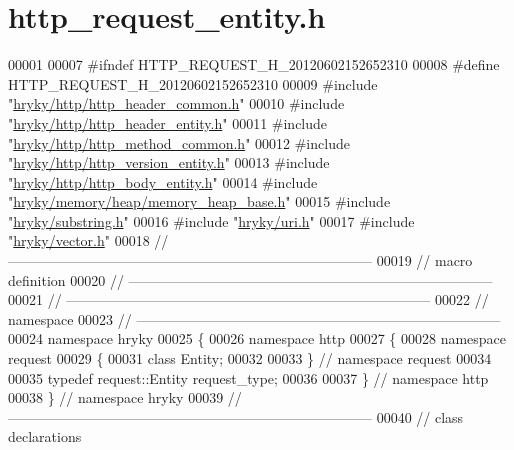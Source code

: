 \hypertarget{http__request__entity_8h_source}{\section{http\-\_\-request\-\_\-entity.\-h}
}

\begin{DoxyCode}
00001 
00007 \textcolor{preprocessor}{#ifndef HTTP\_REQUEST\_H\_20120602152652310}
00008 \textcolor{preprocessor}{}\textcolor{preprocessor}{#define HTTP\_REQUEST\_H\_20120602152652310}
00009 \textcolor{preprocessor}{}\textcolor{preprocessor}{#include "\hyperlink{http__header__common_8h}{hryky/http/http_header_common.h}"}
00010 \textcolor{preprocessor}{#include "\hyperlink{http__header__entity_8h}{hryky/http/http_header_entity.h}"}
00011 \textcolor{preprocessor}{#include "\hyperlink{http__method__common_8h}{hryky/http/http_method_common.h}"}
00012 \textcolor{preprocessor}{#include "\hyperlink{http__version__entity_8h}{hryky/http/http_version_entity.h}"}
00013 \textcolor{preprocessor}{#include "\hyperlink{http__body__entity_8h}{hryky/http/http_body_entity.h}"}
00014 \textcolor{preprocessor}{#include "\hyperlink{memory__heap__base_8h}{hryky/memory/heap/memory_heap_base.h}"}
00015 \textcolor{preprocessor}{#include "\hyperlink{substring_8h}{hryky/substring.h}"}
00016 \textcolor{preprocessor}{#include "\hyperlink{uri_8h}{hryky/uri.h}"}
00017 \textcolor{preprocessor}{#include "\hyperlink{vector_8h}{hryky/vector.h}"}
00018 \textcolor{comment}{//
      ------------------------------------------------------------------------------}
00019 \textcolor{comment}{// macro definition}
00020 \textcolor{comment}{//
      ------------------------------------------------------------------------------}
00021 \textcolor{comment}{//
      ------------------------------------------------------------------------------}
00022 \textcolor{comment}{// namespace}
00023 \textcolor{comment}{//
      ------------------------------------------------------------------------------}
00024 \textcolor{keyword}{namespace }hryky
00025 \{
00026 \textcolor{keyword}{namespace }http
00027 \{
00028 \textcolor{keyword}{namespace }request
00029 \{
00031     \textcolor{keyword}{class }Entity;
00032 
00033 \} \textcolor{comment}{// namespace request}
00034 
00035 \textcolor{keyword}{typedef} request::Entity request\_type;
00036 
00037 \} \textcolor{comment}{// namespace http}
00038 \} \textcolor{comment}{// namespace hryky}
00039 \textcolor{comment}{//
      ------------------------------------------------------------------------------}
00040 \textcolor{comment}{// class declarations}

\end{DoxyCode}
